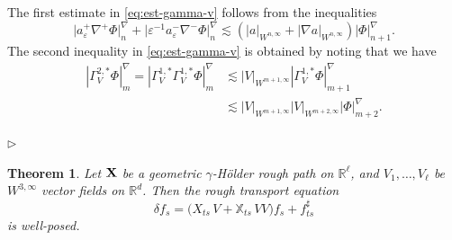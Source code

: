 \documentclass[11pt,a4paper]{amsart}
\newcommand{\RR}{\mathbb{R}}  \newcommand{\CC}{\mathbb{C}}  \newcommand{\LL}{\mathbb{L}}  \newcommand{\WW}{\mathbb{W}}
\newcommand{\bbX}{\mathbb{X}}
\newcommand{\ssk}{\smallskip}
\newtheorem{thm}{\hspace{-0.15cm}  {\sc Theorem} } %
\numberwithin{equation}{section} %
\newenvironment{Dem}{%
    \begin{list}{\hspace{0.5cm}{\sc Proof --}}{%
        \setlength{\topsep}{0pt}%
        \setlength{\leftmargin}{0pt}%
        \setlength{\rightmargin}{0pt}%
        \setlength{\listparindent}{0pt}%
        \setlength{\itemindent}{0pt}%
        \setlength{\parsep}{0pt}%
        \addtolength{\leftmargin}{20pt}%
        \addtolength{\rightmargin}{0pt}%
    } \item }{\hfill{\space $\rhd$}\end{list}\smallskip}
\begin{document}
\begin{Dem}
The first estimate in \eqref{eq:est-gamma-v} follows from the inequalities
$$
\big| a^{+}_\varepsilon \nabla^{+} \Phi\big|^\nabla_{n}+\big| \varepsilon^{-1} a^{-}_\varepsilon \nabla^{-} \Phi\big|^\nabla_{n} \lesssim ( |a|_{W^{n,\infty}} + |\nabla a|_{W^{n,\infty}}) |\Phi|^\nabla_{n+1}.
$$ 
The second inequality in \eqref{eq:est-gamma-v} is obtained by noting that we have 
\begin{equation*}
\begin{split}
|\Gamma_{V}^{2,\ast} \Phi|^\nabla_{m} =  |\Gamma_{V}^{1,\ast}\Gamma_{V}^{1,\ast} \Phi|^\nabla_{m} &\lesssim |V|_{W^{m+1,\infty}} |\Gamma_{V}^{1,\ast} \Phi|^\nabla_{m+1} \\
&\lesssim |V|_{W^{m+1,\infty}} |V|_{W^{m+2,\infty}} | \Phi|^\nabla_{m+2}.
\end{split}
\end{equation*}

\end{Dem}

\ssk

\begin{thm}
\label{ThmTransportL2}
Let ${\bf X}$ be a geometric $\gamma$-H\"older rough path on $\RR^\ell$, and $V_1,\dots,V_\ell$ be $W^{3,\infty}$ vector fields on $\RR^d$. Then the rough transport equation 
$$
\delta f_s = \big(X_{ts}\,V + \bbX_{ts}\,VV\big)f_s + f^\sharp_{ts}
$$ 
is well-posed.
\end{thm}

\ssk
\end{document}
